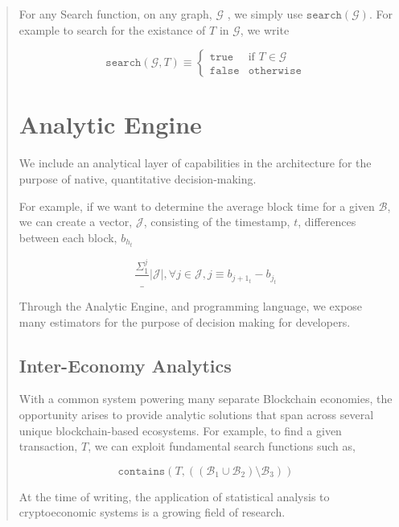 \documentclass[12pt, titlepage, twocolumn]{report}
\begin{document}
\begin{quotation}
For any Search function, on any graph, \(\mathcal{G}\) , we simply use \(\texttt{search}(\mathcal{G})\). For example to search for the existance of \(T\) in \(\mathcal{G}\), we write 

\begin{equation}
	\texttt{search}(\mathcal{G}, T) \equiv
	\begin{cases}
	\texttt{true} & \text{if } T \in \mathcal{G} \\
	\texttt{false} & \texttt{otherwise}
	\end{cases}
	
\end{equation}


\section{Analytic Engine} 
We include an analytical layer of capabilities in the architecture for the purpose of native, quantitative decision-making. 

For example, if we want to determine the average block time for a given \( \boldsymbol{\mathcal{B}} \), we can create a vector, \(\mathcal{J}\), consisting of the timestamp, \(t\), differences between each block, \(b_{h_{t}}\)


\begin{equation}
	{\frac{\Sigma_{1}^{j} }_{\vert \mathcal{J} \vert}} , \forall j \in \mathcal{J} , j \equiv b_{j+1_{t}} - b_{j_{t}}
\end{equation}

Through the Analytic Engine, and programming language, we expose many estimators for the purpose of decision making for developers.

\subsection{Inter-Economy Analytics}
With a common system powering many separate Blockchain economies, the opportunity arises to provide analytic solutions that span across several unique blockchain-based ecosystems. For example, to find a given transaction, \(T\), we can exploit fundamental search functions such as,

\begin{equation}
	\texttt{contains}(T, ((\boldsymbol{\mathcal{B}}_1 \cup \boldsymbol{\mathcal{B}}_2) \setminus \boldsymbol{\mathcal{B}}_3))
\end{equation}

At the time of writing, the application of statistical analysis to cryptoeconomic systems is a growing field of research.



\end{quotation}
\end{document}
